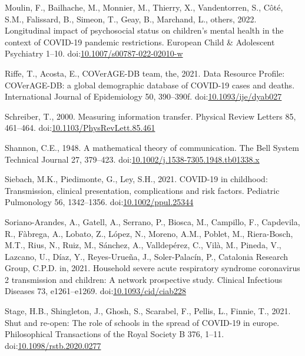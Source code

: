 \documentclass[unnumsec,webpdf,contemporary,large]{oup-authoring-template}%
\theoremstyle{thmstyleone}%
\theoremstyle{thmstyletwo}%
\theoremstyle{thmstylethree}%
\newlength{\cslhangindent}
\newlength{\cslentryspacingunit} %
\newenvironment{CSLReferences}[2] %
 {%
  \setlength{\parindent}{0pt}
  \ifodd #1
  \let\oldpar\par
  \def\par{\hangindent=\cslhangindent\oldpar}
  \fi
  \setlength{\parskip}{#2\cslentryspacingunit}
 }%
 {}
\begin{document}
\begin{CSLReferences}{1}{0}
\leavevmode{}%
Moulin, F., Bailhache, M., Monnier, M., Thierry, X., Vandentorren, S., Côté, S.M., Falissard, B., Simeon, T., Geay, B., Marchand, L., others, 2022. Longitudinal impact of psychosocial status on children's mental health in the context of COVID-19 pandemic restrictions. European Child \& Adolescent Psychiatry 1--10. doi:\href{https://doi.org/10.1007/s00787-022-02010-w}{10.1007/s00787-022-02010-w}

\leavevmode{}%
Riffe, T., Acosta, E., COVerAGE-DB team, the, 2021. {Data Resource Profile: COVerAGE-DB: a global demographic database of COVID-19 cases and deaths}. International Journal of Epidemiology 50, 390--390f. doi:\href{https://doi.org/10.1093/ije/dyab027}{10.1093/ije/dyab027}

\leavevmode{}%
Schreiber, T., 2000. Measuring information transfer. Physical Review Letters 85, 461--464. doi:\href{https://doi.org/10.1103/PhysRevLett.85.461}{10.1103/PhysRevLett.85.461}

\leavevmode{}%
Shannon, C.E., 1948. A mathematical theory of communication. The Bell System Technical Journal 27, 379--423. doi:\href{https://doi.org/10.1002/j.1538-7305.1948.tb01338.x}{10.1002/j.1538-7305.1948.tb01338.x}

\leavevmode{}%
Siebach, M.K., Piedimonte, G., Ley, S.H., 2021. COVID-19 in childhood: Transmission, clinical presentation, complications and risk factors. Pediatric Pulmonology 56, 1342--1356. doi:\href{https://doi.org/10.1002/ppul.25344}{10.1002/ppul.25344}

\leavevmode{}%
Soriano-Arandes, A., Gatell, A., Serrano, P., Biosca, M., Campillo, F., Capdevila, R., Fàbrega, A., Lobato, Z., López, N., Moreno, A.M., Poblet, M., Riera-Bosch, M.T., Rius, N., Ruiz, M., Sánchez, A., Valldepérez, C., Vilà, M., Pineda, V., Lazcano, U., Díaz, Y., Reyes-Urueña, J., Soler-Palacín, P., Catalonia Research Group, C.P.D. in, 2021. Household severe acute respiratory syndrome coronavirus 2 transmission and children: A network prospective study. Clinical Infectious Diseases 73, e1261--e1269. doi:\href{https://doi.org/10.1093/cid/ciab228}{10.1093/cid/ciab228}

\leavevmode{}%
Stage, H.B., Shingleton, J., Ghosh, S., Scarabel, F., Pellis, L., Finnie, T., 2021. Shut and re-open: The role of schools in the spread of COVID-19 in europe. Philosophical Transactions of the Royal Society B 376, 1--11. doi:\href{https://doi.org/10.1098/rstb.2020.0277}{10.1098/rstb.2020.0277}


\end{CSLReferences}
\end{document}
